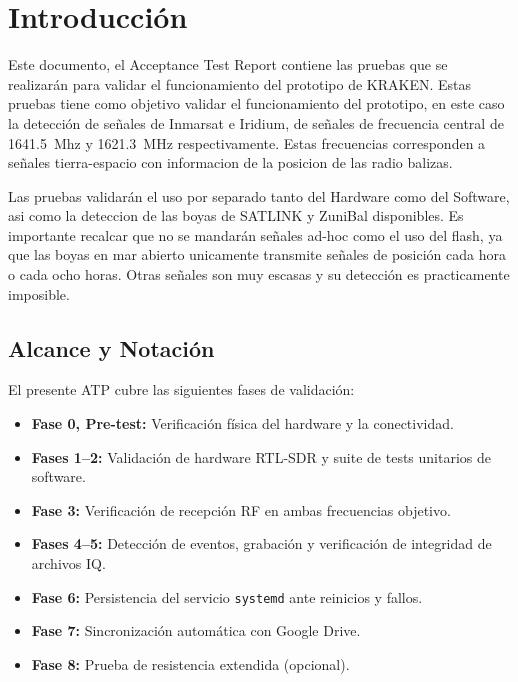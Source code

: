\section{Introducción}
 Este documento, el Acceptance Test Report contiene las pruebas que se realizarán para validar el funcionamiento del prototipo de KRAKEN. Estas pruebas tiene como objetivo validar el funcionamiento del prototipo, en este caso la detección de señales de Inmarsat e Iridium, de señales de frecuencia central de 1641.5~Mhz y 1621.3~MHz respectivamente. Estas frecuencias corresponden a señales tierra-espacio con informacion de la posicion de las radio balizas.

 Las pruebas validarán el uso por separado tanto del Hardware como del Software, asi como la deteccion de las boyas de SATLINK y ZuniBal disponibles. Es importante recalcar que no se mandarán señales ad-hoc como el uso del flash, ya que las boyas en mar abierto unicamente transmite señales de posición cada hora o cada ocho horas. Otras señales son muy escasas y su detección es practicamente imposible.

\subsection{Alcance y Notación}

El presente ATP cubre las siguientes fases de validación:

\begin{itemize}
    \item \textbf{Fase 0, Pre-test:} Verificación física del hardware y la conectividad.
    \item \textbf{Fases 1–2:} Validación de hardware RTL-SDR y suite de tests unitarios de software.
    \item \textbf{Fase 3:} Verificación de recepción RF en ambas frecuencias objetivo.
    \item \textbf{Fases 4–5:} Detección de eventos, grabación y verificación de integridad de archivos IQ.
    \item \textbf{Fase 6:} Persistencia del servicio \texttt{systemd} ante reinicios y fallos.
    \item \textbf{Fase 7:} Sincronización automática con Google Drive.
    \item \textbf{Fase 8:} Prueba de resistencia extendida (opcional).
\end{itemize}

